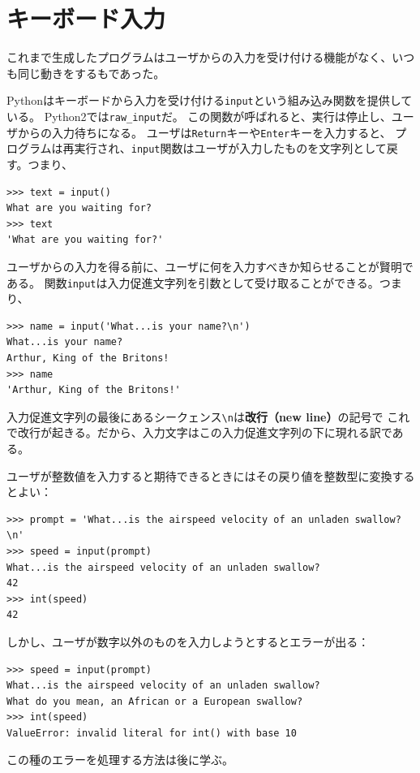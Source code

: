 \documentclass[a4j,12pt,makeidx]{jbook}
\begin{document}
\section{キーボード入力}
これまで生成したプログラムはユーザからの入力を受け付ける機能がなく、いつも同じ動きをするもであった。\par
Pythonはキーボードから入力を受け付ける{\tt input}という組み込み関数を提供している。
Python2では{\tt raw\_input}だ。
この関数が呼ばれると、実行は停止し、ユーザからの入力待ちになる。
ユーザは{\tt Return}キーや{\tt Enter}キーを入力すると、
プログラムは再実行され、{\tt input}関数はユーザが入力したものを文字列として戻す。つまり、
\begin{verbatim}
>>> text = input()
What are you waiting for?
>>> text
'What are you waiting for?'
\end{verbatim}
ユーザからの入力を得る前に、ユーザに何を入力すべきか知らせることが賢明である。
関数{\tt input}は入力促進文字列を引数として受け取ることができる。つまり、
\begin{verbatim}
>>> name = input('What...is your name?\n')
What...is your name?
Arthur, King of the Britons!
>>> name
'Arthur, King of the Britons!'
\end{verbatim}
入力促進文字列の最後にあるシークェンス\verb"\n"は{\bf 改行（new line）}の記号で
これで改行が起きる。だから、入力文字はこの入力促進文字列の下に現れる訳である。\par
ユーザが整数値を入力すると期待できるときにはその戻り値を整数型に変換するとよい：
\begin{verbatim}
>>> prompt = 'What...is the airspeed velocity of an unladen swallow?\n'
>>> speed = input(prompt)
What...is the airspeed velocity of an unladen swallow?
42
>>> int(speed)
42
\end{verbatim}
しかし、ユーザが数字以外のものを入力しようとするとエラーが出る：
\begin{verbatim}
>>> speed = input(prompt)
What...is the airspeed velocity of an unladen swallow?
What do you mean, an African or a European swallow?
>>> int(speed)
ValueError: invalid literal for int() with base 10
\end{verbatim}
この種のエラーを処理する方法は後に学ぶ。
%
\end{document}
